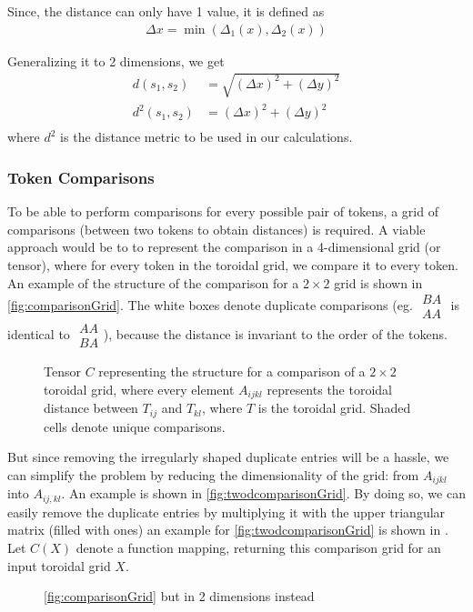 Since, the distance can only have 1 value, it is defined as
\begin{align*}
    \Delta x=\min{(\Delta_1(x),\Delta_2(x))}
\end{align*}

Generalizing it to 2 dimensions, we get
\begin{align*}
    d(s_1,s_2)&=\sqrt{(\Delta x)^2+(\Delta y)^2} \\
    d^2(s_1,s_2)&=(\Delta x)^2+(\Delta y)^2 \\
\end{align*}
where $d^2$ is the distance metric to be used in our calculations.

\subsubsection{Token Comparisons}%
\label{ssub:token_comparisons}
To be able to perform comparisons for every possible pair of tokens, a grid of comparisons (between two tokens to obtain distances) is required. A viable approach would be to to represent the comparison in a 4-dimensional grid (or tensor), where for every token in the toroidal grid, we compare it to every token. An example of the structure of the comparison for a $2\times 2$ grid is shown in \autoref{fig:comparisonGrid}. The white boxes denote duplicate comparisons (eg. $
\begin{smallmatrix}
    BA\\ AA
\end{smallmatrix}
$ is identical to
$
\begin{smallmatrix}
    AA\\ BA
\end{smallmatrix}
$), because the distance is invariant to the order of the tokens.

\begin{figure}[htpb]
    \centering
    \caption{Tensor $C$ representing the structure for a comparison of a $2\times 2$ toroidal grid, where every element $A_{ijkl}$ represents the toroidal distance between $T_{ij}$ and $T_{kl}$, where $T$ is the toroidal grid. Shaded cells denote unique comparisons.}%
    \label{fig:comparisonGrid}
\end{figure}

But since removing the irregularly shaped duplicate entries will be a hassle, we can simplify the problem by reducing the dimensionality of the grid: from $A_{ijkl}$ into $A_{ij,kl}$. An example is shown in \autoref{fig:twodcomparisonGrid}. By doing so, we can easily remove the duplicate entries by multiplying it with the upper triangular matrix (filled with ones) an example for \autoref{fig:twodcomparisonGrid} is shown in . Let $C(X)$ denote a function mapping, returning this comparison grid for an input toroidal grid $X$.

\begin{figure}[htpb]
    \centering
    \caption{\autoref{fig:comparisonGrid} but in 2 dimensions instead}%
    \label{fig:twodcomparisonGrid}
\end{figure}

